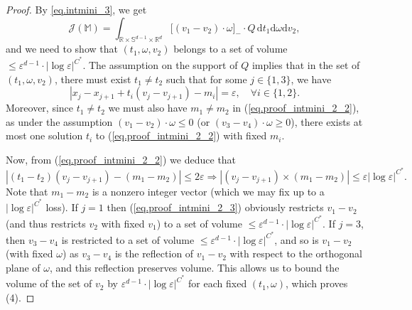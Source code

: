 \documentclass[10pt, reqno]{amsart}
\newcommand{\Mb}{\mathbb M}
\newcommand{\Rb}{\mathbb R}
\newcommand{\Sb}{\mathbb S}
\newcommand {\Jc}{\mathcal J}
\theoremstyle{definition}
\theoremstyle{remark}
\numberwithin{equation}{section}
\begin{document}
\begin{proof}
By \eqref{eq.intmini_3}, we get
\begin{equation}\label{eq.proof_intmini_2_1}
    \Jc(\Mb)=\int_{\Rb\times\Sb^{d-1}\times\Rb^d}\big[(v_1-v_2)\cdot\omega\big]_-\cdot Q\,\mathrm{d}t_1\mathrm{d}\omega\mathrm{d}v_2,
\end{equation} and we need to show that $(t_1,\omega,v_2)$ belongs to a set of volume $\leq\varepsilon^{d-1}\cdot|\log\varepsilon|^{C^*}$. The assumption on the support of $Q$ implies that in the set of $(t_1,\omega,v_2)$, there must exist $t_1\neq t_2$ such that for some $j\in\{1,3\}$, we have
\begin{equation}\label{eq.proof_intmini_2_2}
|x_j-x_{j+1}+t_i(v_j-v_{j+1})-m_i|=\varepsilon,\quad \forall i\in\{1,2\}.
\end{equation} Moreover, since $t_1\neq t_2$ we must also have $m_1\neq m_2$ in (\ref{eq.proof_intmini_2_2}), as under the assumption $(v_1-v_2)\cdot\omega\leq 0$ (or $(v_3-v_4)\cdot\omega\geq 0$), there exists at most one solution $t_i$ to (\ref{eq.proof_intmini_2_2}) with fixed $m_i$.

Now, from (\ref{eq.proof_intmini_2_2}) we deduce that
\begin{equation}\label{eq.proof_intmini_2_3}
|(t_1-t_2)(v_j-v_{j+1})-(m_1-m_2)|\leq 2\varepsilon\Rightarrow |(v_j-v_{j+1})\times (m_1-m_2)|\leq \varepsilon|\log\varepsilon|^{C^*}.
\end{equation} Note that $m_1-m_2$ is a nonzero integer vector (which we may fix up to a $|\log\varepsilon|^{C^*}$ loss). If $j=1$ then (\ref{eq.proof_intmini_2_3}) obviously restricts $v_1-v_2$ (and thus restricts $v_2$ with fixed $v_1$) to a set of volume $\leq\varepsilon^{d-1}\cdot|\log\varepsilon|^{C^*}$. If $j=3$, then $v_3-v_4$ is restricted to a set of volume $\leq\varepsilon^{d-1}\cdot|\log\varepsilon|^{C^*}$, and so is $v_1-v_2$ (with fixed $\omega$) as $v_3-v_4$ is the reflection of $v_1-v_2$ with respect to the orthogonal plane of $\omega$, and this reflection preserves volume. This allows us to bound the volume of the set of $v_2$ by $\varepsilon^{d-1}\cdot|\log\varepsilon|^{C^*}$ for each fixed $(t_1,\omega)$, which proves (4).


\end{proof}
\end{document}
